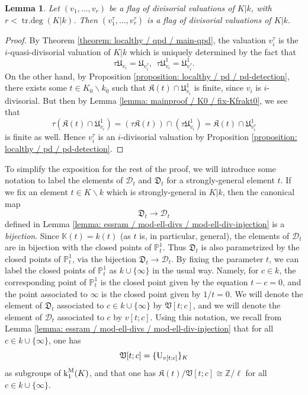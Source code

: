\documentclass[11pt]{amsart}
\newtheorem{lemma}[proposition]{Lemma}
\theoremstyle{definition}
\theoremstyle{remark}
\numberwithin{equation}{section}
\DeclareMathOperator{\trdeg}{tr.deg}
\newcommand{\Z}{\mathbb{Z}}
\newcommand{\U}{{\rm U}}
\newcommand{\Pbb}{\mathbb{P}}
\newcommand{\Kbb}{\mathbb{K}}
\newcommand{\Dcal}{\mathscr{D}}
\newcommand{\Kfrak}{\mathfrak{K}}
\newcommand{\Ufrak}{\mathfrak{U}}
\newcommand{\Dfrak}{\mathfrak{D}}
\newcommand{\Vfrak}{\mathfrak{V}}
\renewcommand{\k}{\operatorname{k}^{\rm M}}
\begin{document}
\begin{lemma}
\label{lemma: mainproof / K0 / divs-local-thy}
  Let $(v_1,\ldots,v_r)$ be a flag of divisorial valuations of $K|k$, with $r < \trdeg(K|k)$.
  Then $(v_1^\tau,\ldots,v_r^\tau)$ is a flag of divisorial valuations of $K|k$.
\end{lemma}
\begin{proof}
  By Theorem \ref{theorem: localthy / qpd / main-qpd}, the valuation $v_i^\tau$ is the $i$-quasi-divisorial valuation of $K|k$ which is uniquely determined by the fact that
  \[ \tau\Ufrak_{v_i} = \Ufrak_{v_i^\tau}, \ \ \tau\Ufrak_{v_i}^1 = \Ufrak_{v_i^\tau}^1. \]
  On the other hand, by Proposition \ref{proposition: localthy / pd / pd-detection}, there exists some $t \in K_0 \smallsetminus k_0$ such that $\Kfrak(t) \cap \Ufrak_{v_i}^1$ is finite, since $v_i$ is $i$-divisorial.
  But then by Lemma \ref{lemma: mainproof / K0 / fix-Kfrakt0}, we see that
  \[ \tau(\Kfrak(t) \cap \Ufrak_{v_i}^1) = (\tau\Kfrak(t)) \cap (\tau \Ufrak_{v_i}^1) = \Kfrak(t) \cap \Ufrak_{v_i^\tau}^1 \]
  is finite as well.
  Hence $v_i^\tau$ is an $i$-divisorial valuation by Proposition \ref{proposition: localthy / pd / pd-detection}.
\end{proof}

To simplify the exposition for the rest of the proof, we will introduce some notation to label the elements of $\Dcal_t$ and $\Dfrak_t$ for a strongly-general element $t$.
If we fix an element $t \in K \smallsetminus k$ which is strongly-general in $K|k$, then the canonical map
\[ \Dfrak_t \rightarrow \Dcal_t \]
defined in Lemma \ref{lemma: essram / mod-ell-divs / mod-ell-div-injection} is a \emph{bijection}.
Since $\Kbb(t) = k(t)$ (as $t$ is, in particular, general), the elements of $\Dcal_t$ are in bijection with the closed points of $\Pbb^1_t$.
Thus $\Dfrak_t$ is also parametrized by the closed points of $\Pbb^1_t$, via the bijection $\Dfrak_t \rightarrow \Dcal_t$.
By fixing the parameter $t$, we can label the closed points of $\Pbb^1_t$ as $k \cup \{\infty\}$ in the usual way.
Namely, for $c \in k$, the corresponding point of $\Pbb^1_t$ is the closed point given by the equation $t-c = 0$, and the point associated to $\infty$ is the closed point given by $1/t = 0$.
We will denote the element of $\Dfrak_t$ associated to $c \in k \cup \{\infty\}$ by $\Vfrak[t;c]$, and we will denote the element of $\Dcal_t$ associated to $c$ by $v[t;c]$.
Using this notation, we recall from Lemma \ref{lemma: essram / mod-ell-divs / mod-ell-div-injection} that for all $c \in k \cup \{\infty\}$, one has
\[ \Vfrak[t;c] = \{\U_{v[t;c]}\}_K \]
as subgroups of $\k_1(K)$, and that one has $\Kfrak(t)/\Vfrak[t;c] \cong \Z/\ell$ for all $c \in k \cup \{\infty\}$.
\end{document}
